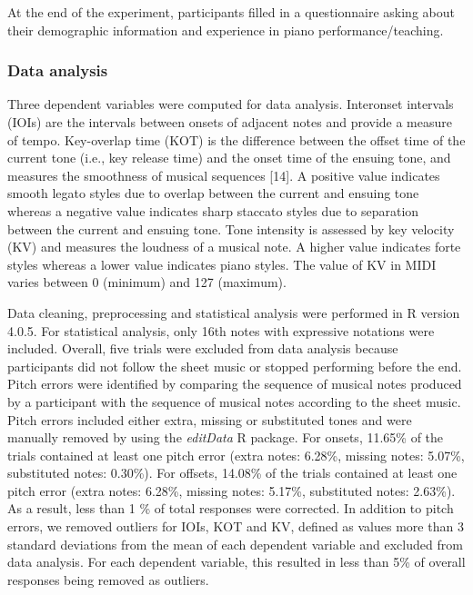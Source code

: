 \documentclass[
  english,
  man,floatsintext]{apa6}
\begin{document}
At the end of the experiment, participants filled in a questionnaire asking about their demographic information and experience in piano performance/teaching.

\hypertarget{data-analysis}{%
\subsubsection{Data analysis}\label{data-analysis}}

Three dependent variables were computed for data analysis. Interonset intervals (IOIs) are the intervals between onsets of adjacent notes and provide a measure of tempo. Key-overlap time (KOT) is the difference between the offset time of the current tone (i.e., key release time) and the onset time of the ensuing tone, and measures the smoothness of musical sequences {[}14{]}. A positive value indicates smooth legato styles due to overlap between the current and ensuing tone whereas a negative value indicates sharp staccato styles due to separation between the current and ensuing tone. Tone intensity is assessed by key velocity (KV) and measures the loudness of a musical note. A higher value indicates forte styles whereas a lower value indicates piano styles. The value of KV in MIDI varies between 0 (minimum) and 127 (maximum).

Data cleaning, preprocessing and statistical analysis were performed in R version 4.0.5. For statistical analysis, only 16th notes with expressive notations were included. Overall, five trials were excluded from data analysis because participants did not follow the sheet music or stopped performing before the end. Pitch errors were identified by comparing the sequence of musical notes produced by a participant with the sequence of musical notes according to the sheet music. Pitch errors included either extra, missing or substituted tones and were manually removed by using the \emph{editData} R package. For onsets, 11.65\% of the trials contained at least one pitch error (extra notes: 6.28\%, missing notes: 5.07\%, substituted notes: 0.30\%). For offsets, 14.08\% of the trials contained at least one pitch error (extra notes: 6.28\%, missing notes: 5.17\%, substituted notes: 2.63\%). As a result, less than 1 \% of total responses were corrected. In addition to pitch errors, we removed outliers for IOIs, KOT and KV, defined as values more than 3 standard deviations from the mean of each dependent variable and excluded from data analysis. For each dependent variable, this resulted in less than 5\% of overall responses being removed as outliers.
\end{document}
